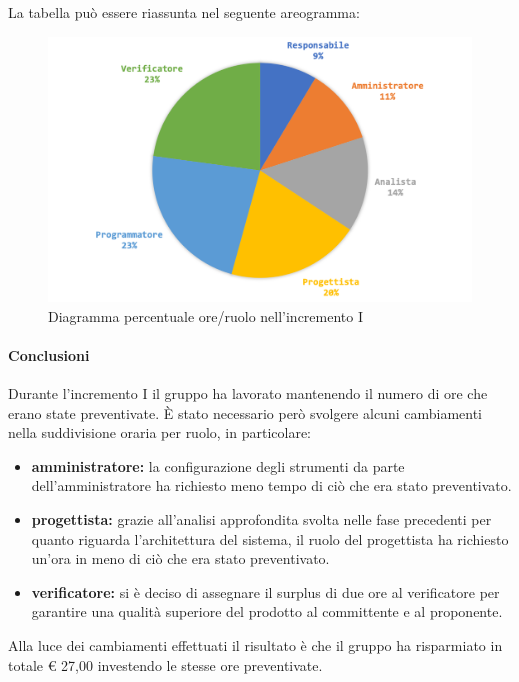 			La tabella può essere riassunta nel seguente areogramma:
			\begin{figure}[H]
				\centering
				\includegraphics[width=0.8\linewidth]{images/consuntivo/ConsIncr1-2.png}
				\caption{Diagramma percentuale ore/ruolo nell'incremento I}
				\label{fig:consuntivo diagramma costi ruolo incremento I}
			\end{figure}

		\paragraph{Conclusioni}
			Durante l'incremento I il gruppo ha lavorato mantenendo il numero di ore che erano state preventivate. È stato necessario però svolgere alcuni cambiamenti nella suddivisione oraria per ruolo, in particolare:
			\begin{itemize}
				\item \textbf{amministratore:} la configurazione degli strumenti da parte dell'amministratore ha richiesto meno tempo di ciò che era stato preventivato.
				\item \textbf{progettista:} grazie all'analisi approfondita svolta nelle fase precedenti per quanto riguarda l'architettura del sistema, il ruolo del progettista ha richiesto un'ora in meno di ciò che era stato preventivato.
				\item \textbf{verificatore:} si è deciso di assegnare il surplus di due ore al verificatore per garantire una qualità superiore del prodotto al committente e al proponente.
			\end{itemize}
			Alla luce dei cambiamenti effettuati il risultato è che il gruppo ha risparmiato in totale € 27,00 investendo le stesse ore preventivate.
			\pagebreak
		
